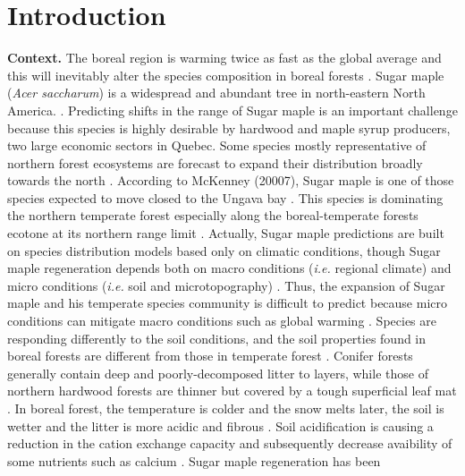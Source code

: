 


\newpage
\setcounter{page}{1}

\section{Introduction}

\textbf{Context.}  The boreal region is warming twice as fast as the global
average and  this will inevitably alter the species composition in boreal
forests \cite{Scheffer2012,Hughes2000,Lafleur2010}. Sugar maple (\textit{Acer
saccharum}) is a widespread and abundant tree in north-eastern North America.
\cite{Graignic2013,Messaoud2007,Kellman2004,Barras1998}. Predicting shifts in
the range of Sugar maple is an important challenge because this species is
highly desirable by hardwood and maple syrup producers, two large economic
sectors in Quebec. Some species mostly representative of northern forest
ecosystems are forecast to expand their distribution broadly towards the north
\cite{Sciences2014,Iverson2002}. According to McKenney (20007), Sugar maple is
one of those species expected to move closed to the Ungava bay
\cite{Sciences2014}. This species is dominating the northern temperate forest
especially along the boreal-temperate forests ecotone at its northern range
limit \cite{Barras1998}. Actually, Sugar maple predictions are built on
species distribution models based only on climatic conditions, though Sugar
maple regeneration depends both on macro conditions (\textit{i.e.} regional
climate) and micro conditions (\textit{i.e.} soil and microtopography)
\cite{Graignic2013,Lafleur2010}. Thus, the expansion of Sugar maple and his
temperate species community is difficult to predict because micro conditions
can mitigate macro conditions such as global warming \cite{DeFrenne2013}.
Species are responding differently to the soil conditions, and the soil
properties found in boreal forests are different from those in temperate
forest \cite{Lafleur2010,Barras1998,Goldblum2010,Demers1998}. Conifer forests
generally contain deep and poorly-decomposed litter to layers, while those of
northern hardwood forests are thinner but covered by a tough superficial leaf
mat \cite{Barras1998}. In boreal forest, the temperature is colder and the
snow melts later, the soil is wetter and the litter is more acidic and fibrous
\cite{Lafleur2010,Goldblum2010}. Soil acidification is causing a reduction in
the cation exchange capacity and subsequently decrease avaibility of some
nutrients such as calcium \cite{Moore2008}. Sugar maple regeneration has been
